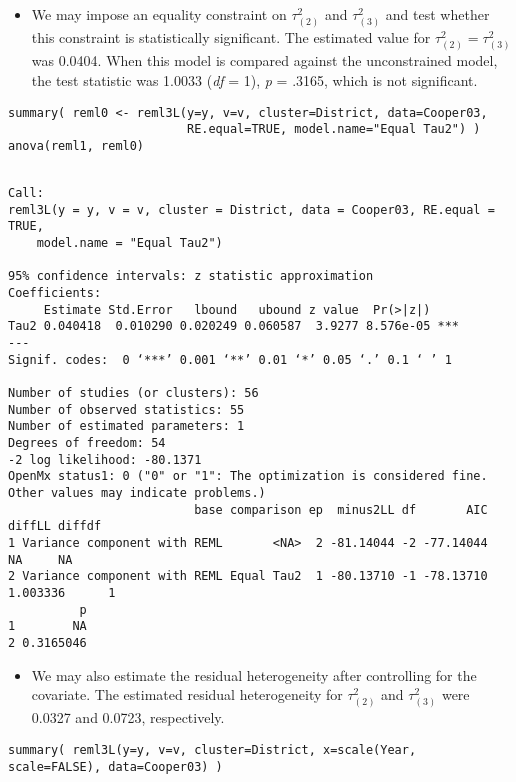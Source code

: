 \documentclass[11pt]{article}
\begin{document}
\begin{itemize}
\item We may impose an equality constraint on \(\tau^2_{(2)}\) and \(\tau^2_{(3)}\) and test whether this constraint is statistically significant. The estimated value for \(\tau^2_{(2)}=\tau^2_{(3)}\) was 0.0404. When this model is compared against the unconstrained model, the test statistic was 1.0033 (\emph{df} = 1), \emph{p} = .3165, which is not significant.
\end{itemize}
\begin{verbatim}
summary( reml0 <- reml3L(y=y, v=v, cluster=District, data=Cooper03,
                         RE.equal=TRUE, model.name="Equal Tau2") )
anova(reml1, reml0)
\end{verbatim}

\begin{verbatim}

Call:
reml3L(y = y, v = v, cluster = District, data = Cooper03, RE.equal = TRUE, 
    model.name = "Equal Tau2")

95% confidence intervals: z statistic approximation
Coefficients:
     Estimate Std.Error   lbound   ubound z value  Pr(>|z|)    
Tau2 0.040418  0.010290 0.020249 0.060587  3.9277 8.576e-05 ***
---
Signif. codes:  0 ‘***’ 0.001 ‘**’ 0.01 ‘*’ 0.05 ‘.’ 0.1 ‘ ’ 1

Number of studies (or clusters): 56
Number of observed statistics: 55
Number of estimated parameters: 1
Degrees of freedom: 54
-2 log likelihood: -80.1371 
OpenMx status1: 0 ("0" or "1": The optimization is considered fine.
Other values may indicate problems.)
                          base comparison ep  minus2LL df       AIC   diffLL diffdf
1 Variance component with REML       <NA>  2 -81.14044 -2 -77.14044       NA     NA
2 Variance component with REML Equal Tau2  1 -80.13710 -1 -78.13710 1.003336      1
          p
1        NA
2 0.3165046
\end{verbatim}

\begin{itemize}
\item We may also estimate the residual heterogeneity after controlling for the covariate. The estimated residual heterogeneity for \(\tau^2_{(2)}\) and \(\tau^2_{(3)}\) were 0.0327 and 0.0723, respectively.
\end{itemize}
\begin{verbatim}
summary( reml3L(y=y, v=v, cluster=District, x=scale(Year, scale=FALSE), data=Cooper03) )
\end{verbatim}
\end{document}
